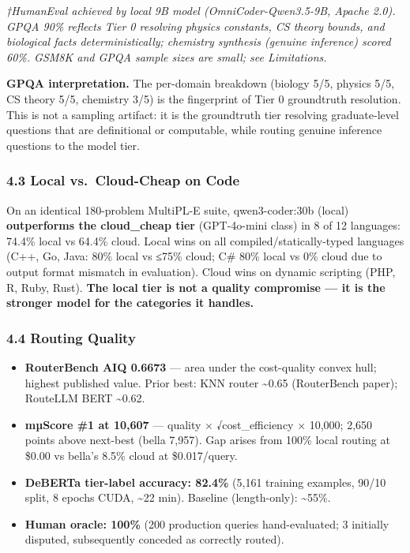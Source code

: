 \emph{†HumanEval achieved by local 9B model (OmniCoder-Qwen3.5-9B, Apache 2.0). GPQA 90\% reflects Tier 0 resolving physics constants, CS theory bounds, and biological facts deterministically; chemistry synthesis (genuine inference) scored 60\%. GSM8K and GPQA sample sizes are small; see Limitations.}

\textbf{GPQA interpretation.} The per-domain breakdown (biology 5/5, physics 5/5, CS theory 5/5, chemistry 3/5) is the fingerprint of Tier 0 groundtruth resolution. This is not a sampling artifact: it is the groundtruth tier resolving graduate-level questions that are definitional or computable, while routing genuine inference questions to the model tier.

\subsubsection{4.3 Local vs.~Cloud-Cheap on Code}\label{local-vs.-cloud-cheap-on-code}

On an identical 180-problem MultiPL-E suite, qwen3-coder:30b (local) \textbf{outperforms the cloud\_cheap tier} (GPT-4o-mini class) in 8 of 12 languages: 74.4\% local vs 64.4\% cloud. Local wins on all compiled/statically-typed languages (C++, Go, Java: 80\% local vs ≤75\% cloud; C\# 80\% local vs 0\% cloud due to output format mismatch in evaluation). Cloud wins on dynamic scripting (PHP, R, Ruby, Rust). \textbf{The local tier is not a quality compromise --- it is the stronger model for the categories it handles.}

\subsubsection{4.4 Routing Quality}\label{routing-quality}

\begin{itemize}
\tightlist
\item
  \textbf{RouterBench AIQ 0.6673} --- area under the cost-quality convex hull; highest published value. Prior best: KNN router \textasciitilde0.65 (RouterBench paper); RouteLLM BERT \textasciitilde0.62.
\item
  \textbf{mµScore \#1 at 10,607} --- quality × √cost\_efficiency × 10,000; 2,650 points above next-best (bella 7,957). Gap arises from 100\% local routing at \$0.00 vs bella's 8.5\% cloud at \$0.017/query.
\item
  \textbf{DeBERTa tier-label accuracy: 82.4\%} (5,161 training examples, 90/10 split, 8 epochs CUDA, \textasciitilde22 min). Baseline (length-only): \textasciitilde55\%.
\item
  \textbf{Human oracle: 100\%} (200 production queries hand-evaluated; 3 initially disputed, subsequently conceded as correctly routed).
\end{itemize}

